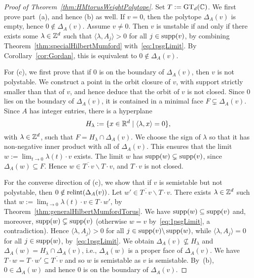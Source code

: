 \begin{proof}[Proof of Theorem~\ref{thm:HMtorusWeightPolytope}]
	Set $T := \operatorname{GT}_d(\mathbb C)$.
	We first prove part~(a), and hence (b) as well. If $v=0$, then the polytope $\Delta_A(v)$ is empty, hence $0 \notin \Delta_A(v)$. Assume $v \neq 0$. Then $v$ is unstable if and only if there exists some $\lambda \in \mathbb Z^d$ such that $\langle \lambda, A_j \rangle > 0$ for all $j \in \operatorname{supp}(v)$, by combining Theorem~\ref{thm:specialHilbertMumford} with~\eqref{eq:1psgLimit}. By Corollary~\ref{cor:Gordan}, this is equivalent to $0 \notin \Delta_A(v)$.
	
	For (c), we first prove that if $0$ is on the boundary of $\Delta_A(v)$, then $v$ is not polystable. We construct a point in the orbit closure of $v$, with support strictly smaller than that of $v$, and hence deduce that the orbit of $v$ is not closed. 
	Since $0$ lies on the boundary of $\Delta_A(v)$, it is contained in a minimal face $F \subsetneq \Delta_A(v)$. Since $A$ has integer entries, there is a hyperplane
		\[ H_{\lambda} := \{ x \in \mathbb R^d \mid \langle \lambda, x \rangle = 0 \} , \]
	with $\lambda \in \mathbb Z^d$, such that $F = H_{\lambda} \cap \Delta_A(v)$. We choose the sign of $\lambda$ so that it has non-negative inner product with all of $\Delta_A(v)$. This ensures that the limit $w := \lim_{t \to 0} \lambda(t) \cdot v$ exists.
	The limit $w$ has $\operatorname{supp}(w) \subsetneq \operatorname{supp}(v)$, since $\Delta_A(w) \subseteq F$. Hence $w \in \overline{T \cdot v} \backslash T \cdot v$, and $T \cdot v$ is not closed.
	
	For the converse direction of (c), we show that if $v$ is semistable but not polystable, then $0 \notin {\rm relint} (\Delta_A(v))$. Let $w' \in \overline{T \cdot v} \backslash T \cdot v$. There exists $\lambda \in \mathbb Z^d$ such that $w := \lim_{t \to 0} \lambda(t) \cdot v \in T \cdot w'$, by Theorem~\ref{thm:generalHilbertMumfordTorus}. We have $\operatorname{supp}(w) \subseteq \operatorname{supp}(v)$ and, moreover, $\operatorname{supp}(w) \subsetneq \operatorname{supp}(v)$ (otherwise $w=v$ by~\eqref{eq:1psgLimit}, a contradiction). 
	Hence $\langle \lambda, A_j \rangle > 0$ for all $j \in \operatorname{supp}(v) \backslash \operatorname{supp}(w)$, while $\langle \lambda, A_j \rangle = 0$ for all $j \in \operatorname{supp}(w)$, by~\eqref{eq:1psgLimit}. We obtain $\Delta_A(v) \nsubseteq H_{\lambda}$ and $\Delta_A(w) = H_{\lambda} \cap \Delta_A(v)$, i.e., $\Delta_A(w)$ is a proper face of $\Delta_A(v)$. We have $T \cdot w = T \cdot w' \subseteq \overline{T \cdot v}$ and so $w$ is semistable as $v$ is semistable. By~(b), $0 \in \Delta_A(w)$ and hence $0$ is on the boundary of $\Delta_A(v)$.
	

\end{proof}
